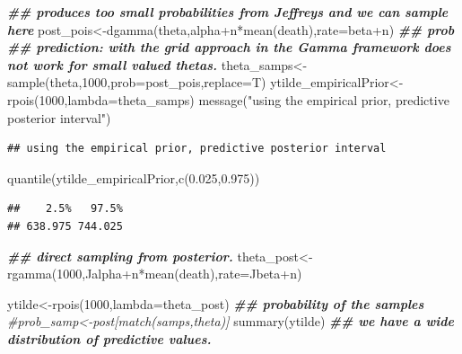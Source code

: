 \documentclass[
]{book}
\newenvironment{Shaded}{\begin{snugshade}}{\end{snugshade}}
\newcommand{\AttributeTok}[1]{\textcolor[rgb]{0.77,0.63,0.00}{#1}}
\newcommand{\CommentTok}[1]{\textcolor[rgb]{0.56,0.35,0.01}{\textit{#1}}}
\newcommand{\DecValTok}[1]{\textcolor[rgb]{0.00,0.00,0.81}{#1}}
\newcommand{\DocumentationTok}[1]{\textcolor[rgb]{0.56,0.35,0.01}{\textbf{\textit{#1}}}}
\newcommand{\FloatTok}[1]{\textcolor[rgb]{0.00,0.00,0.81}{#1}}
\newcommand{\FunctionTok}[1]{\textcolor[rgb]{0.00,0.00,0.00}{#1}}
\newcommand{\NormalTok}[1]{#1}
\newcommand{\OtherTok}[1]{\textcolor[rgb]{0.56,0.35,0.01}{#1}}
\newcommand{\SpecialCharTok}[1]{\textcolor[rgb]{0.00,0.00,0.00}{#1}}
\newcommand{\StringTok}[1]{\textcolor[rgb]{0.31,0.60,0.02}{#1}}
\theoremstyle{definition}
\theoremstyle{definition}
\theoremstyle{definition}
\theoremstyle{definition}
\theoremstyle{remark}
\begin{document}
\begin{Shaded}
\begin{Highlighting}[]
 \DocumentationTok{\#\# produces too small probabilities from Jeffrey\textquotesingle{}s and we can sample here}
\NormalTok{ post\_pois}\OtherTok{\textless{}{-}}\FunctionTok{dgamma}\NormalTok{(theta,alpha}\SpecialCharTok{+}\NormalTok{n}\SpecialCharTok{*}\FunctionTok{mean}\NormalTok{(death),}\AttributeTok{rate=}\NormalTok{beta}\SpecialCharTok{+}\NormalTok{n) }\DocumentationTok{\#\# prob}
\DocumentationTok{\#\#  prediction:  with the grid approach in the Gamma framework does not work for small valued thetas.}
\NormalTok{ theta\_samps}\OtherTok{\textless{}{-}}\FunctionTok{sample}\NormalTok{(theta,}\DecValTok{1000}\NormalTok{,}\AttributeTok{prob=}\NormalTok{post\_pois,}\AttributeTok{replace=}\NormalTok{T)}
\NormalTok{  ytilde\_empiricalPrior}\OtherTok{\textless{}{-}}\FunctionTok{rpois}\NormalTok{(}\DecValTok{1000}\NormalTok{,}\AttributeTok{lambda=}\NormalTok{theta\_samps)}
  \FunctionTok{message}\NormalTok{(}\StringTok{"using the empirical prior, predictive posterior interval"}\NormalTok{)}
\end{Highlighting}
\end{Shaded}

\begin{verbatim}
## using the empirical prior, predictive posterior interval
\end{verbatim}

\begin{Shaded}
\begin{Highlighting}[]
   \FunctionTok{quantile}\NormalTok{(ytilde\_empiricalPrior,}\FunctionTok{c}\NormalTok{(}\FloatTok{0.025}\NormalTok{,}\FloatTok{0.975}\NormalTok{))}
\end{Highlighting}
\end{Shaded}

\begin{verbatim}
##    2.5%   97.5% 
## 638.975 744.025
\end{verbatim}

\begin{Shaded}
\begin{Highlighting}[]
 \DocumentationTok{\#\# direct sampling from posterior.}
\NormalTok{ theta\_post}\OtherTok{\textless{}{-}}\FunctionTok{rgamma}\NormalTok{(}\DecValTok{1000}\NormalTok{,Jalpha}\SpecialCharTok{+}\NormalTok{n}\SpecialCharTok{*}\FunctionTok{mean}\NormalTok{(death),}\AttributeTok{rate=}\NormalTok{Jbeta}\SpecialCharTok{+}\NormalTok{n)}
 
 
\NormalTok{   ytilde}\OtherTok{\textless{}{-}}\FunctionTok{rpois}\NormalTok{(}\DecValTok{1000}\NormalTok{,}\AttributeTok{lambda=}\NormalTok{theta\_post) }
 \DocumentationTok{\#\# probability of the samples }
 \CommentTok{\#prob\_samp\textless{}{-}post[match(samps,theta)]}
  \FunctionTok{summary}\NormalTok{(ytilde) }\DocumentationTok{\#\# we have a wide distribution of predictive values.}
\end{Highlighting}
\end{Shaded}
\end{document}
